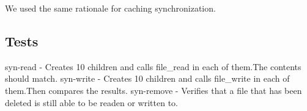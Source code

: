 We used the same rationale for caching synchronization.

\subsection{Tests}

syn-read - Creates 10 children and calls file\_read in each of them.The contents should match.
syn-write - Creates 10 children and calls file\_write in each of them.Then compares the results.
syn-remove - Verifies that a file that has been deleted is still able to be readen or written to.